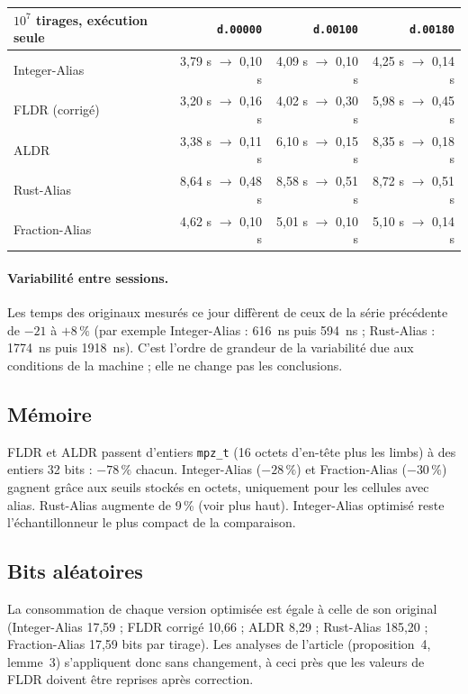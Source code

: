 \documentclass[11pt,a4paper]{article}
\newcommand{\code}[1]{\texttt{#1}}
\begin{document}
\begin{table}[H]
\centering
\small
\begin{tabular}{lrrr}
\toprule
$10^7$ tirages, exécution seule & \code{d.00000} & \code{d.00100} & \code{d.00180} \\
\midrule
Integer-Alias  & 3,79 s $\to$ 0,10 s & 4,09 s $\to$ 0,10 s & 4,25 s $\to$ 0,14 s \\
FLDR (corrigé) & 3,20 s $\to$ 0,16 s & 4,02 s $\to$ 0,30 s & 5,98 s $\to$ 0,45 s \\
ALDR           & 3,38 s $\to$ 0,11 s & 6,10 s $\to$ 0,15 s & 8,35 s $\to$ 0,18 s \\
Rust-Alias     & 8,64 s $\to$ 0,48 s & 8,58 s $\to$ 0,51 s & 8,72 s $\to$ 0,51 s \\
Fraction-Alias & 4,62 s $\to$ 0,10 s & 5,01 s $\to$ 0,10 s & 5,10 s $\to$ 0,14 s \\
\bottomrule
\end{tabular}
\end{table}

\paragraph{Variabilité entre sessions.} Les temps des originaux mesurés ce jour
diffèrent de ceux de la série précédente de $-21$ à $+8\,\%$ (par exemple
Integer-Alias : 616~ns puis 594~ns ; Rust-Alias : 1774~ns puis 1918~ns). C'est l'ordre
de grandeur de la variabilité due aux conditions de la machine ; elle ne change pas
les conclusions.

\subsection{Mémoire}

FLDR et ALDR passent d'entiers \code{mpz\_t} (16 octets d'en-tête plus les limbs) à des
entiers 32 bits : $-78\,\%$ chacun. Integer-Alias ($-28\,\%$) et Fraction-Alias
($-30\,\%$) gagnent grâce aux seuils stockés en octets, uniquement pour les cellules
avec alias. Rust-Alias augmente de 9\,\% (voir plus haut). Integer-Alias optimisé reste
l'échantillonneur le plus compact de la comparaison.

\subsection{Bits aléatoires}

La consommation de chaque version optimisée est égale à celle de son original
(Integer-Alias 17,59 ; FLDR corrigé 10,66 ; ALDR 8,29 ; Rust-Alias 185,20 ;
Fraction-Alias 17,59 bits par tirage). Les analyses de l'article (proposition~4,
lemme~3) s'appliquent donc sans changement, à ceci près que les valeurs de FLDR
doivent être reprises après correction.
\end{document}
